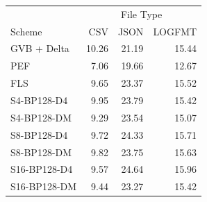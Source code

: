 \begin{tabular}{lrrr}
\toprule
 & \multicolumn{3}{c}{File Type} \\
Scheme & CSV & JSON & LOGFMT \\
\midrule
GVB + Delta & 10.26 & 21.19 & 15.44 \\
PEF & 7.06 & 19.66 & 12.67 \\
FLS & 9.65 & 23.37 & 15.52 \\
S4-BP128-D4 & 9.95 & 23.79 & 15.42 \\
S4-BP128-DM & 9.29 & 23.54 & 15.07 \\
S8-BP128-D4 & 9.72 & 24.33 & 15.71 \\
S8-BP128-DM & 9.82 & 23.75 & 15.63 \\
S16-BP128-D4 & 9.57 & 24.64 & 15.96 \\
S16-BP128-DM & 9.44 & 23.27 & 15.42 \\
\bottomrule
\end{tabular}
